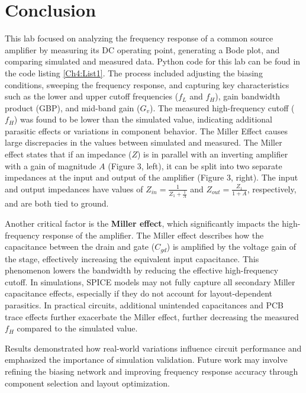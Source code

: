 \section{Conclusion}
\onecolumn
\justifying
\par
This lab focused on analyzing the frequency response of a common source amplifier by measuring its DC operating point, generating a Bode plot, and comparing simulated and measured data. Python code for this lab can be foud in the code listing \cref{Ch4:List1}. The process included adjusting the biasing conditions, sweeping the frequency response, and capturing key characteristics such as the lower and upper cutoff frequencies ($f_L$ and $f_H$), gain bandwidth product (GBP), and mid-band gain ($G_v$). The measured high-frequency cutoff ($f_H$) was found to be lower than the simulated value, indicating additional parasitic effects or variations in component behavior. The Miller Effect causes large discrepacies in the values between simulated and measured. The Miller effect states that if an impedance ($Z$) is in parallel with an inverting amplifier with a gain of magnitude $A$ (Figure 3, left), it can be split into two separate impedances at the input and output of the amplifier (Figure 3, right). 
The input and output impedances have values of $Z_{in} = \frac{1}{Z_1 + \frac{1}{A}}$ and $Z_{out} = \frac{Z_1}{1+A}$, respectively, and are both tied to ground.
\vspace*{0.10cm}
\par
Another critical factor is the \textbf{Miller effect}, which significantly impacts the high-frequency response of the amplifier. The Miller effect describes how the capacitance between the drain and gate ($C_{gd}$) is amplified by the voltage gain of the stage, effectively increasing the equivalent input capacitance. This phenomenon lowers the bandwidth by reducing the effective high-frequency cutoff. In simulations, SPICE models may not fully capture all secondary Miller capacitance effects, especially if they do not account for layout-dependent parasitics. In practical circuits, additional unintended capacitances and PCB trace effects further exacerbate the Miller effect, further decreasing the measured $f_H$ compared to the simulated value.
\vspace*{0.10cm}
\par
Results demonstrated how real-world variations influence circuit performance and emphasized the importance of simulation validation. Future work may involve refining the biasing network and improving frequency response accuracy through component selection and layout optimization.
